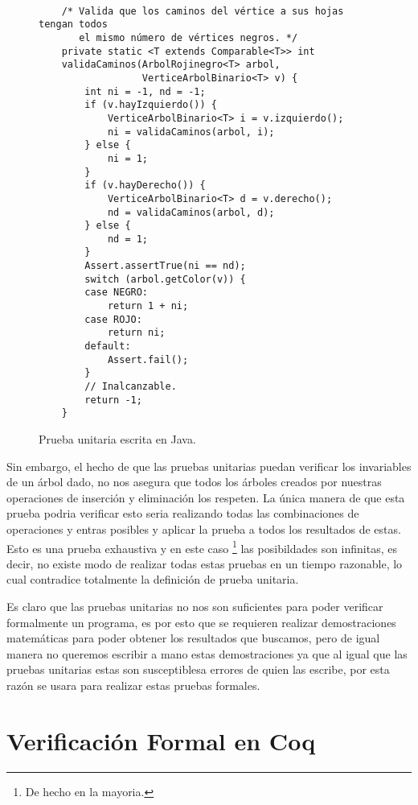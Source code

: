 \begin{figure}
\centering
\captionsetup{justification=centering}
\begin{verbatim}

    /* Valida que los caminos del vértice a sus hojas tengan todos
       el mismo número de vértices negros. */
    private static <T extends Comparable<T>> int
    validaCaminos(ArbolRojinegro<T> arbol,
                  VerticeArbolBinario<T> v) {
        int ni = -1, nd = -1;
        if (v.hayIzquierdo()) {
            VerticeArbolBinario<T> i = v.izquierdo();
            ni = validaCaminos(arbol, i);
        } else {
            ni = 1;
        }
        if (v.hayDerecho()) {
            VerticeArbolBinario<T> d = v.derecho();
            nd = validaCaminos(arbol, d);
        } else {
            nd = 1;
        }
        Assert.assertTrue(ni == nd);
        switch (arbol.getColor(v)) {
        case NEGRO:
            return 1 + ni;
        case ROJO:
            return ni;
        default:
            Assert.fail();
        }
        // Inalcanzable.
        return -1;
    }

\end{verbatim}
\caption{Prueba unitaria escrita en Java.}
\label{unitTestjava}
\end{figure}

Sin embargo, el hecho de que las pruebas unitarias puedan verificar los invariables de un \'arbol
dado, no nos asegura que todos los \'arboles creados por nuestras operaciones de inserci\'on y
eliminaci\'on los respeten. La \'unica manera de que esta prueba podria verificar esto seria
realizando todas las combinaciones de operaciones y entras posibles y aplicar la prueba a todos los
resultados de estas. Esto es una prueba exhaustiva y en este caso \footnote{De hecho en la
mayoria.} las posibildades son infinitas, es decir, no existe modo de realizar todas estas pruebas
en un tiempo razonable, lo cual contradice totalmente la definici\'on de prueba unitaria.

Es claro que las pruebas unitarias no nos son suficientes para poder verificar formalmente un
programa, es por esto que se requieren realizar demostraciones matemáticas para poder obtener los
resultados que buscamos, pero de igual manera no queremos escribir a mano estas demostraciones ya
que al igual que las pruebas unitarias estas son susceptiblesa errores de quien las escribe, por
esta raz\'on se usara {\coq} para realizar estas pruebas formales.

\section{Verificaci\'on Formal en Coq}

